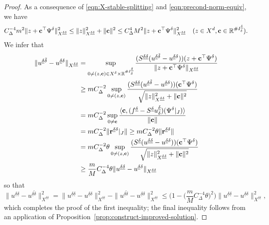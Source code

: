 \documentclass[11pt,a4paper,oneside,english]{amsart}
\numberwithin{equation}{section}
\numberwithin{theorem}{section}
\theoremstyle{definition}
\newcommand{\R}{\mathbb{R}}
\newcommand{\udelta}{{\underline{\delta}}}
\newcommand{\jw}[1]{{\color{red}{JW: #1}}}
\begin{document}
\begin{proof}
  As a consequence of \eqref{eqn:X-stable-splitting} and \eqref{eqn:precond-norm-equiv}, we have
  \[
    C_\Delta^{-4} m^2 \|z+{\bf c}^\top \Psi^\delta\|_{X^{\udelta \udelta}}^2 
    \leq
    \|z\|_{X^{\udelta \udelta}}^2+ \|{\bf c}\|^2
    \leq 
    C_\Delta^{4} M^2 \|z+{\bf c}^\top \Psi^\delta\|_{X^{\udelta \udelta}}^2 \quad (z \in X^d, {\bf c} \in \R^{\# I_\delta^\udelta}).
  \]
  We infer that 
  \begin{align*}
    \|u^{\udelta \tilde{\delta}}-u^{\udelta \delta}\|_{X^{\udelta \udelta}}&=\sup_{0 \neq (z,{\bf c}) \in X^\delta \times \R^{\# I_\delta^\udelta}}
    \frac{(S^{\udelta \udelta}(u^{\udelta \tilde{\delta}}-u^{\udelta \delta}))(z+{\bf c}^\top \Psi^\delta)}{\|z+{\bf c}^\top \Psi^\delta\|_{X^{\udelta \udelta}}}\\
    & \geq m C_\Delta^{-2}  \sup_{0 \neq (z,{\bf c})}
    \frac{(S^{\udelta \udelta}(u^{\udelta \tilde{\delta}}-u^{\udelta \delta}))({\bf c}^\top \Psi^\delta)}{\sqrt{\|z\|_{X^{\udelta \udelta}}^2+\|{\bf c}\|^2}}\\
    & =m C_\Delta^{-2} \sup_{0 \neq {\bf c}}
    \frac{\langle {\bf c},(f^\udelta -S^\udelta u_{\delta}^\udelta)(\Psi^\delta|_J)\rangle}{\|{\bf c}\|}\\
    &=m C_\Delta^{-2} \|{\bf r}^{\udelta \delta}|_J\|  \geq m C_\Delta^{-2} \theta \|{\bf r}^{\udelta \delta}\|\\
    & =m C_\Delta^{-2} \theta \sup_{0 \neq (z,{\bf c})}
    \frac{(S^\udelta(u^{\udelta \udelta}-u^{\udelta \delta}))({\bf c}^\top \Psi^\delta)}{\sqrt{\|z\|_{X^{\udelta \udelta}}^2+\|{\bf c}\|^2}}\\
    & \geq \frac{m}{M} C_\Delta^{-4} \theta
    \|u^{\udelta \udelta}-u^{\udelta \delta}\|_{X^{\udelta \udelta}}
  \end{align*}
  so that
  \[
    \|u^{\udelta \udelta}-u^{\udelta \tilde{\delta}}\|_{X^{\udelta \udelta}}^2=
    \|u^{\udelta \udelta}-u^{\udelta \delta}\|_{X^{\udelta \udelta}}^2-
    \|u^{\udelta \tilde{\delta}}-u^{\udelta \delta}\|_{X^{\udelta \udelta}}^2
    \leq \Big(1-\big(\frac{m}{M} C_\Delta^{-4} \theta\big)^2\Big) \|u^{\udelta \udelta}-u^{\udelta \delta}\|_{X^{\udelta \udelta}}^2,
  \]
  which completes the proof of the first inequality; the final inequality follows
  from an application of Proposition~\ref{prop:construct-improved-solution}.
  \jw{dit bewijs ben ik nog niet nagegaan}
\end{proof}
\end{document}
